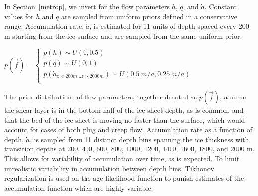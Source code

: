 In Section~\ref{metrop}, we invert for the flow parameters $h$, $q$, and $\dot{a}$. Constant values for $h$ and $q$ are sampled from uniform priors defined in a conservative range. Accumulation rate, $\dot{a}$, is estimated for 11 units of depth spaced every 200 m starting from the ice surface and are sampled from the same uniform prior.

\begin{center}
$p(\vec{f}) = 
	\begin{cases}
		p(h) \sim U(0, 0.5) \\
		p(q) \sim U (0, 1) \\
		p(\dot{a}_{z < 200 m ... z > 2000 m}) \sim U(0.5~m/a,0.25~m/a)\\
	\end{cases}
$	
\end{center}

The prior distributions of flow parameters, together denoted as $p(\vec{f})$, assume the shear layer is in the bottom half of the ice sheet depth, as is common, and that the bed of the ice sheet is moving no faster than the surface, which would account for cases of both plug and creep flow. Accumulation rate as a function of depth, $\dot{a}$, is sampled from 11 distinct depth bins spanning the ice thickness with transition depths at 200, 400, 600, 800, 1000, 1200, 1400, 1600, 1800, and 2000 m. This allows for variability of accumulation over time, as is expected. To limit unrealistic variability in accumulation between depth bins, Tikhonov regularization is used on the age likelihood function to punish estimates of the accumulation function which are highly variable.

